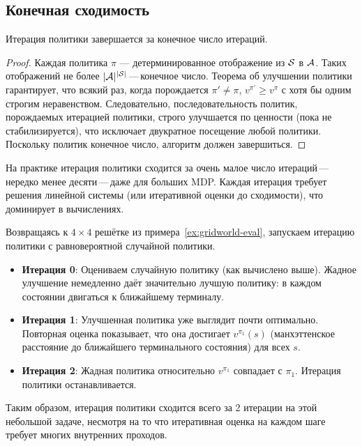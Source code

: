 \subsection*{Конечная сходимость}

\begin{theorem}
\label{thm:pi-convergence}
Итерация политики завершается за конечное число итераций.
\end{theorem}

\begin{proof}
Каждая политика $\pi$ — детерминированное отображение из $\mathcal{S}$ в $\mathcal{A}$.  Таких отображений не более $|\mathcal{A}|^{|\mathcal{S}|}$\,---\,конечное число.  Теорема об улучшении политики гарантирует, что всякий раз, когда порождается $\pi' \ne \pi$, $v^{\pi'} \ge v^\pi$ с хотя бы одним строгим неравенством.  Следовательно, последовательность политик, порождаемых итерацией политики, строго улучшается по ценности (пока не стабилизируется), что исключает двукратное посещение любой политики.  Поскольку политик конечное число, алгоритм должен завершиться.
\end{proof}

\begin{remark}
На практике итерация политики сходится за очень малое число итераций\,---\,нередко менее десяти\,---\,даже для больших MDP.  Каждая итерация требует решения линейной системы (или итеративной оценки до сходимости), что доминирует в вычислениях.
\end{remark}

\begin{example}
\label{ex:pi-gridworld}
Возвращаясь к $4\times4$ решётке из примера~\ref{ex:gridworld-eval}, запускаем итерацию политики с равновероятной случайной политики.

\begin{itemize}[leftmargin=*]
\item \textbf{Итерация 0}: Оцениваем случайную политику (как вычислено выше).  Жадное улучшение немедленно даёт значительно лучшую политику: в каждом состоянии двигаться к ближайшему терминалу.
\item \textbf{Итерация 1}: Улучшенная политика уже выглядит почти оптимально.  Повторная оценка показывает, что она достигает $v^{\pi_1}(s) $ (манхэттенское расстояние до ближайшего терминального состояния) для всех $s$.
\item \textbf{Итерация 2}: Жадная политика относительно $v^{\pi_1}$ совпадает с $\pi_1$.  Итерация политики останавливается.
\end{itemize}
Таким образом, итерация политики сходится всего за 2 итерации на этой небольшой задаче, несмотря на то что итеративная оценка на каждом шаге требует многих внутренних проходов.
\end{example} 

